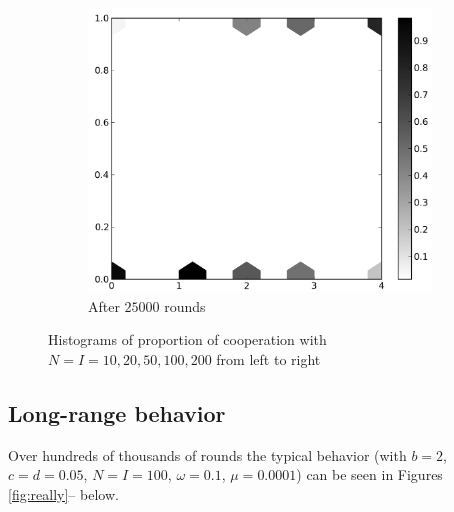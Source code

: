 \documentclass{amsart}
\begin{document}
\begin{figure}[h!tbp]
\begin{subfigure}{.485\linewidth}
    \includegraphics[width=\linewidth]{varyN25000.png}
    \caption{After $25000$ rounds}
    \label{fig:varyN25000}
  \end{subfigure}
  \caption{Histograms of proportion of cooperation with
    $N=I=10,20,50,100,200$ from left to right}
\end{figure}

\subsection{Long-range behavior}
\label{sec:longrange}
Over hundreds of thousands of rounds the typical behavior (with $b=2$,
$c = d = 0.05$, $N = I = 100$, $\omega = 0.1$, $\mu = 0.0001$) can be
seen in Figures \ref{fig:really}-- below.
\end{document}

